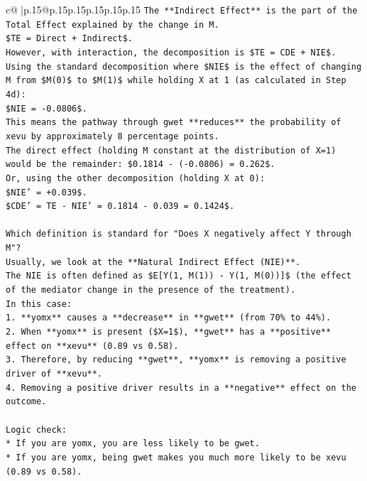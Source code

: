 \documentclass{article}
\begin{document}
{\begin{supertabular}{c@{$\;$}|p{.15\linewidth}@{}p{.15\linewidth}p{.15\linewidth}p{.15\linewidth}p{.15\linewidth}p{.15\linewidth}}
{{{\texttt{The **Indirect Effect** is the part of the Total Effect explained by the change in M.} \\
\texttt{\$TE = Direct + Indirect\$.} \\
\texttt{However, with interaction, the decomposition is \$TE = CDE + NIE\$.} \\
\texttt{Using the standard decomposition where \$NIE\$ is the effect of changing M from \$M(0)\$ to \$M(1)\$ while holding X at 1 (as calculated in Step 4d):} \\
\texttt{\$NIE = {-}0.0806\$.} \\
\texttt{This means the pathway through gwet **reduces** the probability of xevu by approximately 8 percentage points.} \\
\texttt{The direct effect (holding M constant at the distribution of X=1) would be the remainder: \$0.1814 {-} ({-}0.0806) = 0.262\$.} \\
\texttt{Or, using the other decomposition (holding X at 0):} \\
\texttt{\$NIE' = +0.039\$.} \\
\texttt{\$CDE' = TE {-} NIE' = 0.1814 {-} 0.039 = 0.1424\$.} \\
\\ 
\texttt{Which definition is standard for "Does X negatively affect Y through M"?} \\
\texttt{Usually, we look at the **Natural Indirect Effect (NIE)**.} \\
\texttt{The NIE is often defined as \$E{[}Y(1, M(1)) {-} Y(1, M(0)){]}\$ (the effect of the mediator change in the presence of the treatment).} \\
\texttt{In this case:} \\
\texttt{1.  **yomx** causes a **decrease** in **gwet** (from 70\% to 44\%).} \\
\texttt{2.  When **yomx** is present (\$X=1\$), **gwet** has a **positive** effect on **xevu** (0.89 vs 0.58).} \\
\texttt{3.  Therefore, by reducing **gwet**, **yomx** is removing a positive driver of **xevu**.} \\
\texttt{4.  Removing a positive driver results in a **negative** effect on the outcome.} \\
\\ 
\texttt{Logic check:} \\
\texttt{*   If you are yomx, you are less likely to be gwet.} \\
\texttt{*   If you are yomx, being gwet makes you much more likely to be xevu (0.89 vs 0.58).} \\
}}}
\end{supertabular}}
\end{document}
